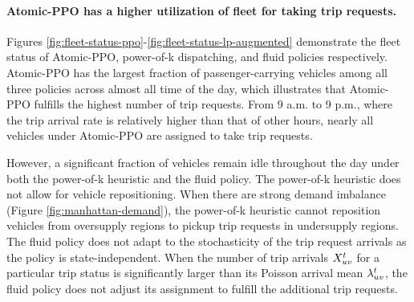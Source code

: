 
\paragraph{Atomic-PPO has a higher utilization of fleet for taking trip requests.} Figures \ref{fig:fleet-status-ppo}-\ref{fig:fleet-status-lp-augmented} demonstrate the fleet status of Atomic-PPO, power-of-k dispatching, and fluid policies respectively. Atomic-PPO has the largest fraction of passenger-carrying vehicles among all three policies across almost all time of the day, which illustrates that Atomic-PPO fulfills the highest number of trip requests. From 9 a.m. to 9 p.m., where the trip arrival rate is relatively higher than that of other hours, nearly all vehicles under Atomic-PPO are assigned to take trip requests. 

However, a significant fraction of vehicles remain idle throughout the day under both the power-of-k heuristic and the fluid policy. The power-of-k heuristic does not allow for vehicle repositioning. When there are strong demand imbalance (Figure \ref{fig:manhattan-demand}), the power-of-k heuristic cannot reposition vehicles from oversupply regions to pickup trip requests in undersupply regions. The fluid policy does not adapt to the stochasticity of the trip request arrivals as the policy is state-independent. When the number of trip arrivals $X_{uv}^{t}$ for a particular trip status is significantly larger than its Poisson arrival mean $\lambda_{uv}^{t}$, the fluid policy does not adjust its assignment to fulfill the additional trip requests.

